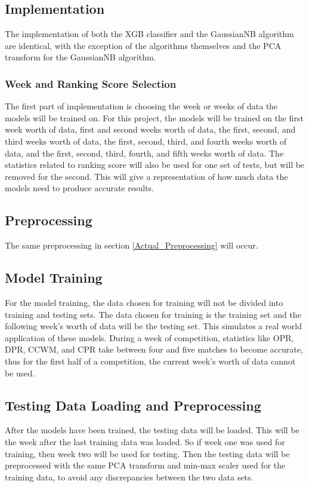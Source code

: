 \documentclass{article}
\begin{document}
\subsection{Implementation}
\par
The implementation of both the XGB classifier and the GaussianNB algorithm are identical, with the exception of the algorithms themselves and the PCA transform for the GaussianNB algorithm.

\subsubsection{Week and Ranking Score Selection} \label{week_select}
\par
The first part of implementation is choosing the week or weeks of data the models will be trained on. For this project, the models will be trained on the first week worth of data, first and second weeks worth of data, the first, second, and third weeks worth of data, the first, second, third, and fourth weeks worth of data, and the first, second, third, fourth, and fifth weeks worth of data. The statistics related to ranking score will also be used for one set of tests, but will be removed for the second. This will give a representation of how much data the models need to produce accurate results.

\subsection{Preprocessing}
\par
The same preprocessing in section \ref{Actual_Preprocessing} will occur.

\subsection{Model Training}
\par
For the model training, the data chosen for training will not be divided into training and testing sets. The data chosen for training is the training set and the following week's worth of data will be the testing set. This simulates a real world application of these models. During a week of competition, statistics like OPR, DPR, CCWM, and CPR take between four and five matches to become accurate, thus for the first half of a competition, the current week's worth of data cannot be used.

\subsection{Testing Data Loading and Preprocessing}
\par
After the models have been trained, the testing data will be loaded. This will be the week after the last training data was loaded. So if week one was used for training, then week two will be used for testing. Then the testing data will be preprocessed with the same PCA transform and min-max scaler used for the training data, to avoid any discrepancies between the two data sets.
\end{document}
